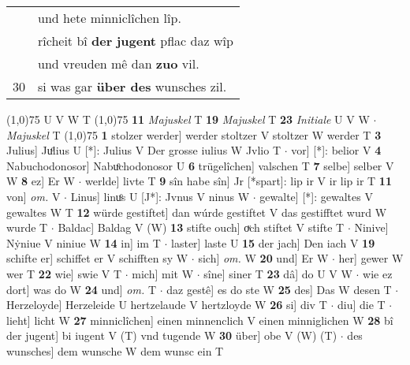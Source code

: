 \documentclass[8pt,a4paper,notitlepage]{article}
\begin{document}
\begin{table}[ht]
\begin{minipage}[t]{0.5\linewidth}
\begin{tabular}{rl}
 & und hete minniclîchen lîp.\\ 
 & rîcheit bî \textbf{der} \textbf{jugent} pflac daz wîp\\ 
 & und vreuden mê dan \textbf{zuo} vil.\\ 
30 & si was gar \textbf{über des} wunsches zil.\\ 
\end{tabular}
\scriptsize
\line(1,0){75} \newline
U V W T \newline
\line(1,0){75} \newline
\textbf{11} \textit{Majuskel} T  \textbf{19} \textit{Majuskel} T  \textbf{23} \textit{Initiale} U V W   $\cdot$ \textit{Majuskel} T  \newline
\line(1,0){75} \newline
\textbf{1} stolzer werder] werder stoltzer V stoltzer W werder T \textbf{3} Julius] Juͦlius U [*]: Julius V Der grosse iulius W Jvlio T  $\cdot$ vor] [*]: belior V \textbf{4} Nabuchodonosor] Nabuͦchodonosor U \textbf{6} trügelîchen] valschen T \textbf{7} selbe] selber V W \textbf{8} ez] Er W  $\cdot$ werlde] livte T \textbf{9} sîn habe sîn] Jr [*spart]: lip ir V ir lip ir T \textbf{11} von] \textit{om.} V  $\cdot$ Linus] linuͦs U [J*]: Jvnus V ninus W  $\cdot$ gewalte] [*]: gewaltes V gewaltes W T \textbf{12} würde gestiftet] dan wúrde gestiftet V das gestifftet wurd W wurde T  $\cdot$ Baldac] Baldag V (W) \textbf{13} stifte ouch] oͮch stiftet V stifte T  $\cdot$ Ninive] Nẏniue V niniue W \textbf{14} in] im T  $\cdot$ laster] laste U \textbf{15} der jach] Den iach V \textbf{19} schifte er] schiffet er V schifften sy W  $\cdot$ sich] \textit{om.} W \textbf{20} und] Er W  $\cdot$ her] gewer W wer T \textbf{22} wie] swie V T  $\cdot$ mich] mit W  $\cdot$ sîne] siner T \textbf{23} dâ] do U V W  $\cdot$ wie ez dort] was do W \textbf{24} und] \textit{om.} T  $\cdot$ daz gestê] es do ste W \textbf{25} des] Das W desen T  $\cdot$ Herzeloyde] Herzeleide U hertzelaude V hertzloyde W \textbf{26} si] div T  $\cdot$ diu] die T  $\cdot$ lieht] licht W \textbf{27} minniclîchen] einen minnenclich V einen minniglichen W \textbf{28} bî der jugent] bi iugent V (T) vnd tugende W \textbf{30} über] obe V (W) (T)  $\cdot$ des wunsches] dem wunsche W dem wunsc ein T \newline
\end{minipage}
\end{table}
\end{document}
